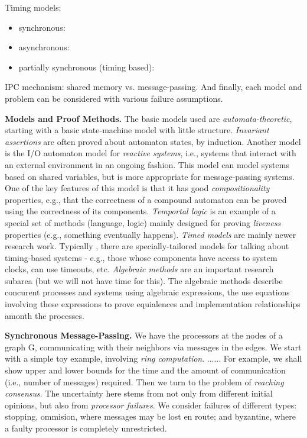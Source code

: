 \documentclass{report}
\theoremstyle{plain}
\theoremstyle{definition}
\theoremstyle{remark}
\begin{document}
Timing models: 
\begin{itemize}
    \item synchronous: 
    \item asynchronous: 
    \item partially synchronous (timing based):
\end{itemize}

IPC mechanism: shared memory vs. message-passing. 
And finally, each model and problem can be considered with various failure 
assumptions. 

\noindent \textbf{Models and Proof Methods.} The basic models used are 
\textit{automata-theoretic}, 
starting with a basic state-machine model with little structure. 
\textit{Invariant assertions} are often proved about automaton states, by induction. 
Another model is the I/O automaton model for \textit{reactive systems}, i.e., 
systems that interact with an external environment in an ongoing fashion. 
This model can model systems based on shared variables, but is more appropriate
for message-passing systems. One of the key features of this model is that it 
has good \textit{compositionality} properties, e.g., that the correctness of a 
compound automaton can be proved using the correctness of its components. 
\textit{Temportal logic} is an example of a special set of methods (language, logic)
mainly designed for proving \textit{liveness} properties (e.g., something
eventually happens). \textit{Timed models} are mainly newer research work. Typically
, there are specially-tailored models for talking about timing-based systems 
- e.g., those whose components have access to system clocks, can use timeouts, etc. 
\textit{Algebraic methods} are an important research subarea (but we will not have
time for this). The algebraic methods describe concurent processes and systems 
using algebraic expressions, the use equations involving these expressions to 
prove equialences and implementation relationships amonth the processes. 

\noindent \textbf{Synchronous Message-Passing.} We have the processors at the nodes of a graph
G, communicating with their neighbors via messages in the edges. We start with 
a simple toy example, involving \textit{ring computation}. ...... 
For example, we shall show upper and lower bounds for the time and the amount of
communication (i.e., number of messages) required. 
Then we turn to the problem of \textit{reaching consensus}. The uncertainty 
here stems from not only from different initial opinions, but also from 
\textit{processor failures}. We consider failures of different types: stopping, 
ommision, where messages may be lost en route; and byzantine, where a faulty 
processor is completely unrestricted. 
\end{document}
